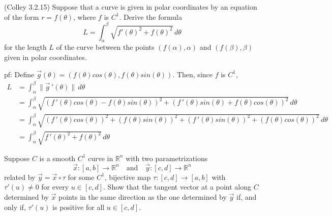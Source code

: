 \documentclass[11pt,letterpaper,cm]{nupset}
\begin{document}
\begin{problem}[Exercise 8] (Colley 3.2.15) Suppose that a curve is given in polar coordinates by an equation of the form $r=f(\theta)$, where $f$ is $C^1$. Derive the formula
	\[ L = \int_\alpha^\beta \sqrt{f'(\theta)^2+f(\theta)^2}\,d\theta \]
	for the length $L$ of the curve between the points $(f(\alpha),\alpha)$ and $(f(\beta),\beta)$ given in polar coordinates.
\end{problem}
\begin{solution}
	pf: Define $\vec{g}(\theta)=(f(\theta)cos(\theta),f(\theta)sin(\theta))$. Then, since $f$ is $C^1$,
	\begin{align*}
		L&=\int_\alpha^\beta \|\vec{g}\,'(\theta)\|\,d\theta\\
		&=\int_\alpha^\beta \sqrt{(f\,'(\theta)cos(\theta)-f(\theta)sin(\theta))^2+(f\,'(\theta)sin(\theta)+f(\theta)cos(\theta))^2}\,d\theta\\
		&=\int_\alpha^\beta \sqrt{(f\,'(\theta)cos(\theta))^2+(f(\theta)sin(\theta))^2+(f\,'(\theta)sin(\theta))^2+(f(\theta)cos(\theta))^2}\,d\theta\\
		&=\int_\alpha^\beta \sqrt{f\,'(\theta)^2+f(\theta)^2}\,d\theta
	\end{align*}
\end{solution}
\newpage

\begin{problem}[Exercise 9] Suppose $C$ is a smooth $C^1$ curve in $\mathbb{R}^n$ with two parametrizations
	\[ \vec{x}: [a,b] \to \mathbb{R}^n \quad\text{and}\quad \vec{y}: [c,d] \to \mathbb{R}^n \]
	related by $\vec{y} = \vec{x} \circ \tau$ for some $C^1$, bijective map $\tau: [c,d] \to [a,b]$ with $\tau'(u)\neq 0$ for every $u\in [c,d]$. Show that the tangent vector at a point along $C$ determined by $\vec{x}$ points in the same direction as the one determined by $\vec{y}$ if, and only if, $\tau'(u)$ is positive for all $u \in [c,d]$.
\end{problem}
\begin{solution}
\end{solution}
\newpage
\end{document}
